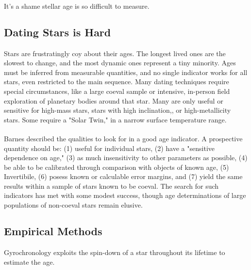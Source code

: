 \documentclass[11pt,letterpaper,draft,titlepage]{article}
\begin{document}
		\paragraph{}
		It's a shame stellar age is so difficult to measure. 
		
		\subsection{Dating Stars is Hard}
		\paragraph{}
		Stars are frustratingly coy about their ages. The longest lived ones are the slowest to change, and the most dynamic ones represent a tiny minority. Ages must be inferred from measurable quantities, and no single indicator works for all stars, even restricted to the main sequence.\cite{Sod2010} Many dating techniques require special circumstances, like a large coeval sample or intensive, in-person field exploration of planetary bodies around that star. Many are only useful or sensitive for high-mass stars, stars with high inclination\cite{Bar2007},\cite{Sku1972}, or high-metallicity stars. Some require a "Solar Twin," in a narrow surface temperature range\cite{Car2016}.
		\paragraph{}
		Barnes \cite{Bar2007} described the qualities to look for in a good age indicator. A prospective quantity should be: (1) useful for individual stars, (2) have a "sensitive dependence on age," (3) as much insensitivity to other parameters as possible, (4) be able to be calibrated through comparison with objects of known age, (5) Invertibile, (6) posess known or calculable error margins, and (7) yield the same results within a sample of stars known to be coeval. The search for such indicators has met with some modest success, though age determinations of large populations of non-coeval stars remain elusive.
		
		\subsection{Empirical Methods}
		\paragraph{}
		Gyrochronology exploits the spin-down of a star throughout its lifetime to estimate the age. 
		
\end{document}
